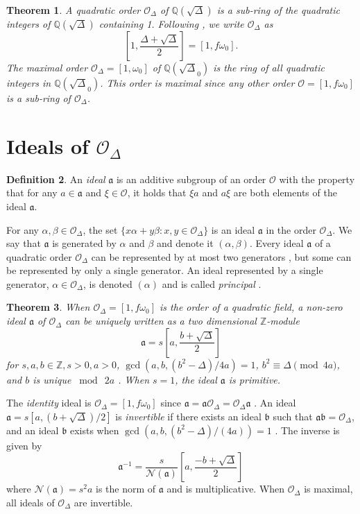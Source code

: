 \documentclass{ucalgthes1}
\theoremstyle{plain}
\newtheorem{thm}{Theorem}[section]
\theoremstyle{definition}
\newtheorem{defn}[thm]{Definition}
\newcommand{\OO}{\mathcal{O}}
\newcommand{\ZZ}{\mathbb{Z}}
\newcommand{\QQ}{\mathbb{Q}}
\begin{document}
\begin{thm}
A \emph{quadratic order} $\OO_\Delta$ of $\QQ(\sqrt\Delta)$ is a sub-ring of the quadratic integers of $\QQ(\sqrt\Delta)$ containing 1.  Following \cite[p.81]{Jacobson2009}, we write $\OO_\Delta$ as
\[
	\left[ 1, \frac{\Delta + \sqrt{\Delta}}{2} \right] = [1, f\omega_0].
\]
The maximal order $\OO_\Delta = [1, \omega_0]$ of $\QQ(\sqrt\Delta_0)$ is the ring of all quadratic integers in $\QQ(\sqrt\Delta_0)$.  This order is maximal since any other order $\OO = [1, f\omega_0]$ is a sub-ring of $\OO_\Delta$. 
\end{thm}


\bigbreak
\section{Ideals of $\OO_\Delta$}

\begin{defn}
An \emph{ideal} $\mathfrak a$ is an additive subgroup of an order $\OO$ with the property that for any $a \in \mathfrak a$ and $\xi \in \OO$, it holds that $\xi a$ and $a \xi$ are both elements of the ideal $\mathfrak a$.
\end{defn}

For any $\alpha, \beta \in \OO_\Delta$, the set $\{x \alpha + y \beta : x, y \in \OO_\Delta\}$ is an ideal $\mathfrak a$ in the order $\OO_\Delta$.  We say that $\mathfrak a$ is generated by $\alpha$ and $\beta$ and denote it $(\alpha, \beta)$.  Every ideal $\mathfrak a$ of a quadratic order $\OO_\Delta$ can be represented by at most two generators \cite{Cohn1980}, but some can be represented by only a single generator. An ideal represented by a single generator, $\alpha \in \OO_\Delta$, is denoted $(\alpha)$ and is called \emph{principal} \cite[p.87]{Jacobson2009}.

\begin{thm}
\label{thm:idealZModule}
When $\OO_\Delta = [1, f\omega_0]$ is the order of a quadratic field, a non-zero ideal $\mathfrak a$ of $\OO_\Delta$ can be uniquely written as a two dimensional $\ZZ$-module 
\[
	\mathfrak a = s\left[a, \frac{b+\sqrt{\Delta}}{2} \right]
\]
for $s, a, b \in \ZZ, s > 0, a > 0$, $\gcd(a, b, (b^2-\Delta)/4a)=1$, $b^2 \equiv \Delta \pmod{4a}$, and $b$ is unique $\bmod ~2a$ \cite[p.13]{Jacobson1999}. When $s = 1$, the ideal $\mathfrak a$ is \emph{primitive}.
\end{thm}

The \emph{identity} ideal is $\OO_\Delta = [1, f\omega_0]$ since $\mathfrak a = \mathfrak a \OO_\Delta = \OO_\Delta \mathfrak a$ \cite{Cohn1980}. An ideal $\mathfrak a = s[a, (b+\sqrt{\Delta})/2]$ is \emph{invertible} if there exists an ideal $\mathfrak b$ such that $\mathfrak a \mathfrak b = \OO_\Delta$, and an ideal $\mathfrak b$ exists when $\gcd(a, b, (b^2-\Delta)/(4a)) = 1$ \cite[p.14]{Jacobson1999}. The inverse is given by \cite[pp.14,15]{Jacobson1999}
\[
	{\mathfrak a}^{-1} = \frac{s}{\mathcal N(\mathfrak a)} \left[a, \frac{-b+\sqrt{\Delta}}{2} \right]
\]
where $\mathcal N(\mathfrak a) = s^2a$ is the norm of $\mathfrak a$ and is multiplicative. When $\OO_\Delta$ is maximal, all ideals of $\OO_\Delta$ are invertible. 
\end{document}
